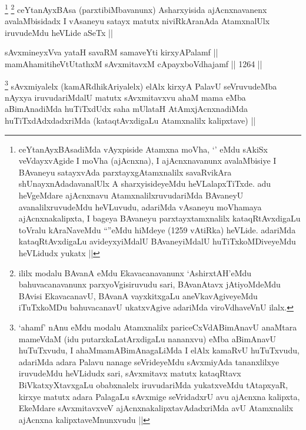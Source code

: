 \begin{artha}
\footnote{ceYtanAyxBAsadiMda vAyxpiside Atamxna moVha, `\stext' eMdu sAkiSx veVdayxvAgide I moVha (ajAcnxna), I ajAcnxnavanunx avalaMbisiye I BAvaneyu satayxvAda parxtayxgAtamxnalilx savaRvikAra shUnayxnAdadavanalUlx A sharxyisideyeMdu heVLalapxTiTxde. adu heVgeMdare ajAcnxnavu AtamxnalilxruvudariMda BAvaneyU avanalilxruvudeMdu heVLuvudu, adariMda vAsaneyu moVhamaya ajAcnxnakalipxta, I bageya BAvaneyu parxtayxtamxnalilx kataqRtAvxdigaLu toVralu kAraNaveMdu ``\stext''eMdu hiMdeye (1259 vAtiRka) heVLide. adariMda kataqRtAvxdigaLu avideyxyiMdalU BAvaneyiMdalU huTiTxkoMDiveyeMdu heVLidudx yukatx ||}
\footnote{ililx modalu BAvanA eMdu Ekavacanavanunx `AshirxtAH'eMdu bahuvacanavanunx parxyoVgisiruvudu sari, BAvanAtavx jAtiyoMdeMdu BAvisi EkavacanavU, BAvanA vayxkitxgaLu aneVkavAgiveyeMdu iTuTxkoMDu bahuvacanavU ukatxvAgive adariMda viroVdhaveVnU ilalx.}
ceYtanAyxBAsa (parxtibiMbavanunx) Asharxyisida ajAcnxnavanenx avalaMbisidadx I vAsaneyu satayx matutx niviRkAranAda AtamxnalUlx iruvudeMdu heVLide aSeTx ||
\end{artha}


\begin{shl}
sAvxmineyxVva yataH savaRM samaveYti kirxyAPalamf || \\
mamAhamitiheVtUtathxM sAvxmitavxM cApayxboVdhajamf ||  1264 ||  
\end{shl}

\begin{artha}
\footnote{`ahamf' nAnu eMdu modalu Atamxnalilx pariceCxVdABimAnavU anaMtara mameVdaM (idu putarxkaLatArxdigaLu nananxvu) eMba aBimAnavU huTuTxvudu, I ahaMmamABimAnagaLiMda I elAlx kamaRvU huTuTxvudu, adariMda adara Palavu nanage seVrideyeMdu sAvxmiyAda tananxlilxye iruvudeMdu heVLidudx sari, sAvxmitavx matutx kataqRtavx BiVkatxyXtavxgaLu obabxnalelx iruvudariMda yukatxveMdu tAtapxyaR, kirxye matutx adara PalagaLu sAvxmige seVridadxrU avu ajAcnxna kalipxta, EkeMdare sAvxmitavxveV ajAcnxnakalipxtavAdadxriMda avU Atamxnalilx ajAcnxna kalipxtaveMnunxvudu ||}
sAvxmiyalelx (kamARdhikAriyalelx) elAlx kirxyA PalavU seVruvudeMba nAyxya iruvudariMdalU matutx sAvxmitavxvu ahaM mama eMba aBimAnadiMda huTiTxdUdx saha mUlataH AtAmxjAcnxnadiMda huTiTxdAdxdadxriMda (kataqtAvxdigaLu Atamxnalilx kalipxtave) ||
\end{artha}



